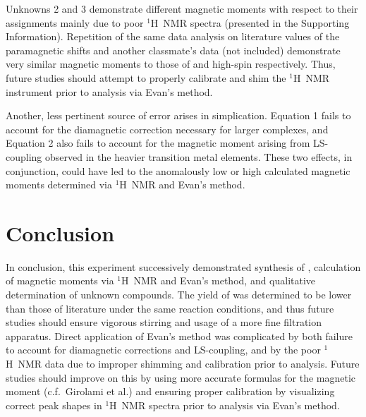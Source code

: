 \documentclass[journal = jacsat, manuscript = article, layout = twocolumn]{achemso}
\newcommand{\h}{$^1$H}
\newcommand{\acac}[1]{\ce{#1(acac)3}}
\begin{document}
Unknowns 2 and 3 demonstrate different magnetic moments with respect to their
assignments mainly due to poor \h\ NMR spectra (presented in the Supporting
Information). Repetition of the same data analysis on literature values of the
paramagnetic shifts \cite{handout} and another classmate's data (not included)
demonstrate very similar magnetic moments to those of \acac{Cr} and
high-spin \acac{Fe} respectively. Thus, future studies should attempt to properly
calibrate and shim the \h\ NMR instrument prior to analysis via Evan's method.

Another, less pertinent source of error arises in simplication. Equation 1 fails
to account for the diamagnetic correction necessary for larger complexes,
\cite{handout} and Equation 2 also fails to account for the magnetic moment
arising from LS-coupling observed in the heavier transition metal elements.
\cite{handout, textbook, textbook_2} These two effects, in conjunction, could
have led to the anomalously low or high calculated magnetic moments determined
via \h\ NMR and Evan's method.

\section{Conclusion}

In conclusion, this experiment successively demonstrated synthesis of \acac{Mn},
calculation of magnetic moments via \h\ NMR and Evan's method, and qualitative
determination of unknown compounds. The yield of \acac{Mn} was determined to be
lower than those of literature under the same reaction conditions, and thus
future studies should ensure vigorous stirring and usage of a more fine
filtration apparatus. Direct application of Evan's method was complicated by
both failure to account for diamagnetic corrections and LS-coupling, and by the
poor \h\ NMR data due to improper shimming and calibration prior to analysis.
Future studies should improve on this by using more accurate formulas for the
magnetic moment (c.f.\ Girolami et al.) and ensuring proper calibration by
visualizing correct peak shapes in \h\ NMR spectra prior to analysis via Evan's
method.


\end{document}
